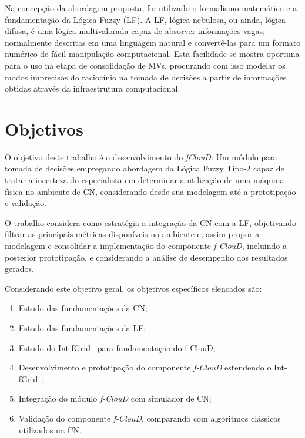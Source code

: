\documentclass[tcc,capa]{texufpel}
\begin{document}
Na concepção da abordagem proposta, foi utilizado o formalismo matemático e a fundamentação da Lógica Fuzzy (LF). A LF, lógica nebulosa, ou ainda, lógica difusa, é uma lógica multivalorada capaz de absorver informações vagas, normalmente descritas em uma linguagem natural e convertê-las para um formato numérico de fácil manipulação computacional. Esta facilidade se mostra oportuna para o uso na etapa de consolidação de MVs, procurando com isso modelar os modos imprecisos do raciocínio na tomada de decisões a partir de informações obtidas através da infraestrutura computacional.

\section{Objetivos}

O objetivo deste trabalho é o desenvolvimento do \emph{fClouD}: Um módulo para tomada de decisões empregando abordagem da Lógica Fuzzy Tipo-2 capaz de tratar a incerteza do especialista em determinar a utilização de uma máquina física no ambiente de CN, considerando desde sua modelagem até a prototipação e validação.

O trabalho considera como estratégia a integração da CN com a LF, objetivando filtrar as principais métricas disponíveis no ambiente e, assim propor a modelagem e consolidar a implementação do componente \emph{f-ClouD}, incluindo a posterior prototipação, e considerando a análise de desempenho dos resultados gerados.

Considerando este objetivo geral, os objetivos específicos elencados são:

\begin{enumerate}
    \item Estudo das fundamentações da CN;
    \item Estudo das fundamentações da LF;
    \item Estudo do Int-fGrid~\cite{moura2018int} para fundamentação do f-ClouD;
    \item Desenvolvimento e prototipação do componente \emph{f-ClouD} estendendo o Int-fGrid~\cite{moura2018int};
    \item Integração do módulo \emph{f-ClouD} com simulador de CN;
    \item Validação do componente \emph{f-ClouD}, comparando com algoritmos clássicos utilizados na CN.
\end{enumerate}
\end{document}

